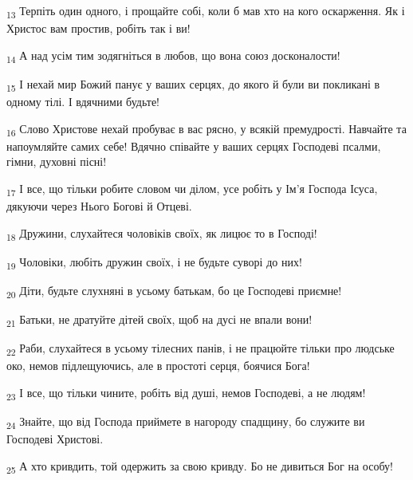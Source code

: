 \begin{tcolorbox}
\textsubscript{13} Терпіть один одного, і прощайте собі, коли б мав хто на кого оскарження. Як і Христос вам простив, робіть так і ви!
\end{tcolorbox}
\begin{tcolorbox}
\textsubscript{14} А над усім тим зодягніться в любов, що вона союз досконалости!
\end{tcolorbox}
\begin{tcolorbox}
\textsubscript{15} І нехай мир Божий панує у ваших серцях, до якого й були ви покликані в одному тілі. І вдячними будьте!
\end{tcolorbox}
\begin{tcolorbox}
\textsubscript{16} Слово Христове нехай пробуває в вас рясно, у всякій премудрості. Навчайте та напоумляйте самих себе! Вдячно співайте у ваших серцях Господеві псалми, гімни, духовні пісні!
\end{tcolorbox}
\begin{tcolorbox}
\textsubscript{17} І все, що тільки робите словом чи ділом, усе робіть у Ім'я Господа Ісуса, дякуючи через Нього Богові й Отцеві.
\end{tcolorbox}
\begin{tcolorbox}
\textsubscript{18} Дружини, слухайтеся чоловіків своїх, як лицює то в Господі!
\end{tcolorbox}
\begin{tcolorbox}
\textsubscript{19} Чоловіки, любіть дружин своїх, і не будьте суворі до них!
\end{tcolorbox}
\begin{tcolorbox}
\textsubscript{20} Діти, будьте слухняні в усьому батькам, бо це Господеві приємне!
\end{tcolorbox}
\begin{tcolorbox}
\textsubscript{21} Батьки, не дратуйте дітей своїх, щоб на дусі не впали вони!
\end{tcolorbox}
\begin{tcolorbox}
\textsubscript{22} Раби, слухайтеся в усьому тілесних панів, і не працюйте тільки про людське око, немов підлещуючись, але в простоті серця, боячися Бога!
\end{tcolorbox}
\begin{tcolorbox}
\textsubscript{23} І все, що тільки чините, робіть від душі, немов Господеві, а не людям!
\end{tcolorbox}
\begin{tcolorbox}
\textsubscript{24} Знайте, що від Господа приймете в нагороду спадщину, бо служите ви Господеві Христові.
\end{tcolorbox}
\begin{tcolorbox}
\textsubscript{25} А хто кривдить, той одержить за свою кривду. Бо не дивиться Бог на особу!
\end{tcolorbox}
